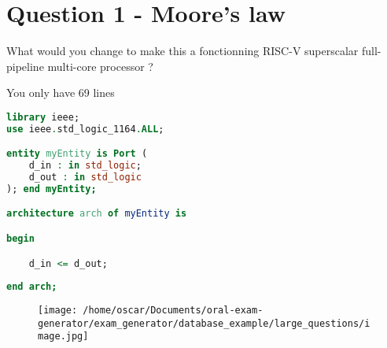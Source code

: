 \section*{Question 1 - Moore's law}

What would you change to make this a fonctionning RISC-V superscalar full-pipeline multi-core processor ?

You only have 69 lines

\vspace{0.5cm}
\begin{lstlisting}[language=vhdl]
library ieee;
use ieee.std_logic_1164.ALL;

entity myEntity is Port (
	d_in : in std_logic;
	d_out : in std_logic
); end myEntity;

architecture arch of myEntity is

begin     

	d_in <= d_out;
	 
end arch;
\end{lstlisting}
\vspace{0.5cm}


\vspace{0.5cm}
\begin{figure}[H]
	\centering
	\texttt{[image: /home/oscar/Documents/oral-exam-generator/exam\_generator/database\_example/large\_questions/image.jpg]}
\end{figure}

\newpage
\null
\newpage